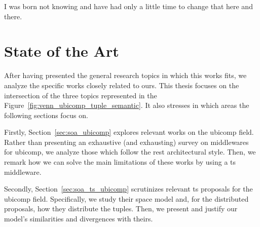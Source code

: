 
\begin{savequote}[50mm]
I was born not knowing and have had only a little time to change that here and there.
\end{savequote}


\chapter{State of the Art}
\label{cha:stateoftheart}

\ifpdf
    \graphicspath{{\pathchapthree/figures/PNG/}{\pathchapthree/figures/PDF/}{\pathchapthree/figures/}}
\else
    \graphicspath{{\pathchapthree/figures/EPS/}{\pathchapthree/figures/}}
\fi



After having presented the general research topics in which this works fits, we analyze the specific works closely related to ours.
This thesis focuses on the intersection of the three topics represented in the Figure~\ref{fig:venn_ubicomp_tuple_semantic}. %
It also stresses in which areas the following sections focus on.


Firstly, Section~\ref{sec:soa_ubicomp} explores relevant works on the \ac{ubicomp} field.
Rather than presenting an exhaustive (and exhausting) survey on middlewares for \ac{ubicomp},
we analyze those which follow the \ac{rest} architectural style.
Then, we remark how we can solve the main limitations of these works by using a \ac{ts} middleware.


Secondly, Section~\ref{sec:soa_ts_ubicomp} scrutinizes relevant \ac{ts} proposals for the \ac{ubicomp} field.
Specifically, we study their space model and, for the distributed proposals, how they distribute the tuples.
Then, we present and justify our model's similarities and divergences with theirs.


